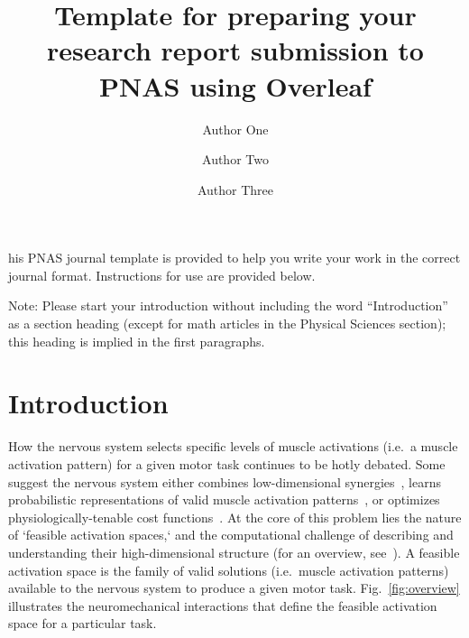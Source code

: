 \documentclass[9pt,twocolumn,twoside,lineno]{pnas-new}
\title{Template for preparing your research report submission to PNAS using Overleaf}
\author[a,c,1]{Author One}
\author[b,1,2]{Author Two}
\author[a]{Author Three}
\affil[a]{Affiliation One}
\affil[b]{Affiliation Two}
\affil[c]{Affiliation Three}
\begin{document}
\verticaladjustment{-2pt}

\maketitle
\thispagestyle{firststyle}

his PNAS journal template is provided to help you write your work in the correct journal format.  Instructions for use are provided below.

Note: Please start your introduction without including the word ``Introduction'' as a section heading (except for math articles in the Physical Sciences section); this heading is implied in the first paragraphs.


\section*{Introduction}
How the nervous system selects specific levels of muscle activations (i.e.\, a muscle activation pattern) for a given motor task continues to be hotly debated.
Some suggest the nervous system either combines low-dimensional synergies~\cite{kutch2012challenges,steele2013number,bizzi2013neural,dingwell2010walkingvariability,racz2013spatiotemporal,steele2015consequences,alessandro2013musclesynergies}, learns probabilistic representations of valid muscle activation patterns~\cite{kording2004bayesian, Kording2014130,berniker2013examination,sanger2011distributed}, or optimizes physiologically-tenable cost functions~\cite{Chao1978Graphical,Prilutsky2000Muscle,scott2004optimal,todorov2002optimal,crowninshield1981physiologically,higginson2005simulated}.
At the core of this problem lies the nature of `feasible activation spaces,` and the computational challenge of describing and understanding their high-dimensional structure (for an overview, see~\cite{valero-cuevas2015fundamentals}). A feasible activation space is the family of valid solutions (i.e.\, muscle activation patterns) available to the nervous system to produce a given motor task.
Fig.~\ref{fig:overview} illustrates the neuromechanical interactions that define the feasible activation space for a particular task.
\end{document}
